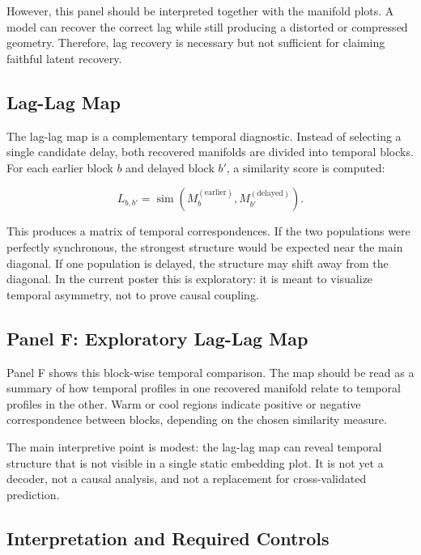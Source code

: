 \documentclass[11pt]{article}
\begin{document}
However, this panel should be interpreted together with the manifold plots. A
model can recover the correct lag while still producing a distorted or
compressed geometry. Therefore, lag recovery is necessary but not sufficient
for claiming faithful latent recovery.

\subsection{Lag-Lag Map}

The lag-lag map is a complementary temporal diagnostic. Instead of selecting a
single candidate delay, both recovered manifolds are divided into temporal
blocks. For each earlier block $b$ and delayed block $b'$, a similarity score
is computed:

\begin{equation}
L_{b,b'}
=
\operatorname{sim}
\left(
M_b^{(\text{earlier})},
M_{b'}^{(\text{delayed})}
\right).
\end{equation}

This produces a matrix of temporal correspondences. If the two populations
were perfectly synchronous, the strongest structure would be expected near the
main diagonal. If one population is delayed, the structure may shift away from
the diagonal. In the current poster this is exploratory: it is meant to
visualize temporal asymmetry, not to prove causal coupling.

\subsection{Panel F: Exploratory Lag-Lag Map}

Panel F shows this block-wise temporal comparison. The map should be read as a
summary of how temporal profiles in one recovered manifold relate to temporal
profiles in the other. Warm or cool regions indicate positive or negative
correspondence between blocks, depending on the chosen similarity measure.

The main interpretive point is modest: the lag-lag map can reveal temporal
structure that is not visible in a single static embedding plot. It is not yet
a decoder, not a causal analysis, and not a replacement for cross-validated
prediction.

\subsection{Interpretation and Required Controls}
\end{document}
